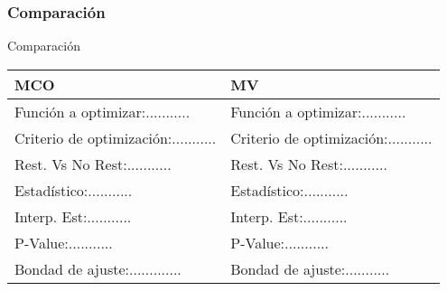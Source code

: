 \subsubsection{Comparación}
\begin{frame}{Comparación}
	
	\begin{tabular}{|l|l|}
		\hline
		\textbf{MCO} & \textbf{MV} \\
		\hline
		Función a optimizar:........... & Función a optimizar:........... \\
		Criterio de optimización:........... & Criterio de optimización:........... \\
		Rest. Vs No Rest:........... & Rest. Vs No Rest:........... \\
		Estadístico:...........& Estadístico:........... \\
		Interp. Est:........... & Interp. Est:........... \\
		P-Value:........... & P-Value:........... \\
		Bondad de ajuste:............. & Bondad de ajuste:........... \\
		\hline
	\end{tabular}
\end{frame}